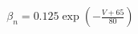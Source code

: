 \documentclass[preview]{standalone}
\begin{document}
\begin{align*}
\beta_n = 0.125 \exp \left( -\frac{V + 65}{80} \right)
\end{align*}
\end{document}
